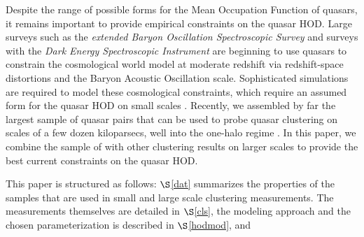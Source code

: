 \documentclass[useAMS,usenatbib]{mn2e}
\begin{document}
Despite the range of possible forms for the Mean Occupation Function of quasars, it remains important to provide empirical 
constraints on the quasar HOD. Large surveys such as the {\em extended Baryon Oscillation Spectroscopic Survey} 
\citep{my15,daw16} and surveys with the {\em Dark Energy Spectroscopic Instrument} \citep{DESI1,DESI2} are beginning to use 
quasars to constrain the cosmological world model at moderate redshift via redshift-space distortions and the Baryon 
Acoustic Oscillation scale. Sophisticated simulations are required to model these cosmological constraints, which require 
an assumed form for the quasar HOD on small scales \citep[e.g.][]{rod17}. Recently, we assembled by far the largest sample of 
quasar pairs that can be used to probe quasar clustering on scales of a few dozen kiloparsecs, well into the one-halo 
regime \citep[][]{ef17}. In this paper, we combine the sample of \citet{ef17} with other clustering results on larger 
scales \citep[e.g.][]{ko12,la17} to provide the best current constraints on the quasar HOD.




This paper is structured as follows: $\S$\ref{dat} summarizes the properties of 
the samples that are used in small and large scale clustering measurements. The measurements 
themselves are detailed in $\S$\ref{cls}, the modeling approach and the chosen 
parameterization is described in $\S$\ref{hodmod}, and 
\end{document}
